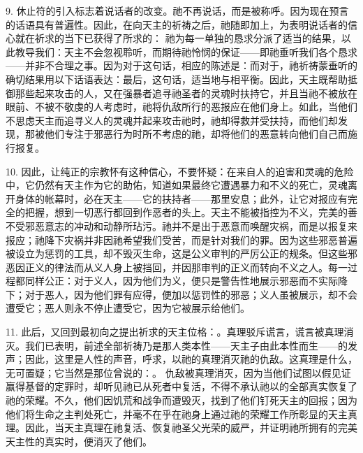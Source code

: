 9. 休止符的引入标志着说话者的改变。祂不再说话，而是被称呼。因为现在预言的话语具有普遍性。因此，在向天主的祈祷之后，祂随即加上，为表明说话者的信心就在祈求的当下已获得了所求的： 祂为每一单独的恳求分派了适当的结果，以此教导我们：天主不会忽视聆听，而期待祂怜悯的保证——即祂垂听我们各个恳求——并非不合理之事。因为对于这句话，相应的陈述是：而对于，祂祈祷蒙垂听的确切结果用以下话语表达：最后，这句话，适当地与相平衡。因此，天主既帮助抵御那些起来攻击的人，又在强暴者追寻祂圣者的灵魂时扶持它，并且当祂不被放在眼前、不被不敬虔的人考虑时，祂将仇敌所行的恶报应在他们身上。如此，当他们不思虑天主而追寻义人的灵魂并起来攻击祂时，祂却得救并受扶持，而他们却发现，那被他们专注于邪恶行为时所不考虑的祂，却将他们的恶意转向他们自己而施行报复。\par

10. 因此，让纯正的宗教怀有这种信心，不要怀疑：在来自人的迫害和灵魂的危险中，它仍然有天主作为它的助佑，知道如果最终它遭遇暴力和不义的死亡，灵魂离开身体的帐幕时，必在天主——它的扶持者——那里安息；此外，让它对报应有完全的把握，想到一切恶行都回到作恶者的头上。天主不能被指控为不义，完美的善不受邪恶意志的冲动和动静所玷污。祂并不是出于恶意而唤醒灾祸，而是以报复来报应；祂降下灾祸并非因祂希望我们受苦，而是针对我们的罪。因为这些邪恶普遍被设立为惩罚的工具，却不毁灭生命，这是公义审判的严厉公正的规条。但这些邪恶因正义的律法而从义人身上被挡回，并因那审判的正义而转向不义之人。每一过程都同样公正：对于义人，因为他们为义，便只是警告性地展示邪恶而不实际降下；对于恶人，因为他们罪有应得，便加以惩罚性的邪恶；义人虽被展示，却不会遭受它；恶人则永不停止遭受它，因为它被展示给他们。\par

11. 此后，又回到最初向之提出祈求的天主位格：。真理驳斥谎言，谎言被真理消灭。我们已表明，前述全部祈祷乃是那人类本性——天主子由此本性而生——的发声；因此，这里是人性的声音，呼求，以祂的真理消灭祂的仇敌。这真理是什么，无可置疑；它当然是那位曾说的：。 仇敌被真理消灭，因为当他们试图以假见证赢得基督的定罪时，却听见祂已从死者中复活，不得不承认祂以的全部真实恢复了祂的荣耀。不久，他们因饥荒和战争而遭毁灭，找到了他们钉死天主的回报；因为他们将生命之主判处死亡，并毫不在乎在祂身上通过祂的荣耀工作所彰显的天主真理。因此，当天主真理在祂复活、恢复祂圣父光荣的威严，并证明祂所拥有的完美天主性的真实时，便消灭了他们。\par

